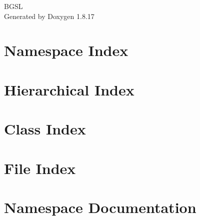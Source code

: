 \let\mypdfximage\pdfximage\def\pdfximage{\immediate\mypdfximage}\documentclass[twoside]{book}
\newcommand{\+}{\discretionary{\mbox{\scriptsize$\hookleftarrow$}}{}{}}
\newcommand{\clearemptydoublepage}{%
  \newpage{\pagestyle{empty}\cleardoublepage}%
}
\begin{document}
\hypersetup{pageanchor=false,
             bookmarksnumbered=true,
             pdfencoding=unicode
            }
\begin{titlepage}
\vspace*{7cm}
\begin{center}%
{\Large B\+G\+SL }\\
\vspace*{1cm}
{\large Generated by Doxygen 1.8.17}\\
\end{center}
\end{titlepage}
\clearemptydoublepage
{}
\tableofcontents
\clearemptydoublepage
{}
\hypersetup{pageanchor=true}

\chapter{Namespace Index}

\chapter{Hierarchical Index}

\chapter{Class Index}

\chapter{File Index}

\chapter{Namespace Documentation}





\end{document}
